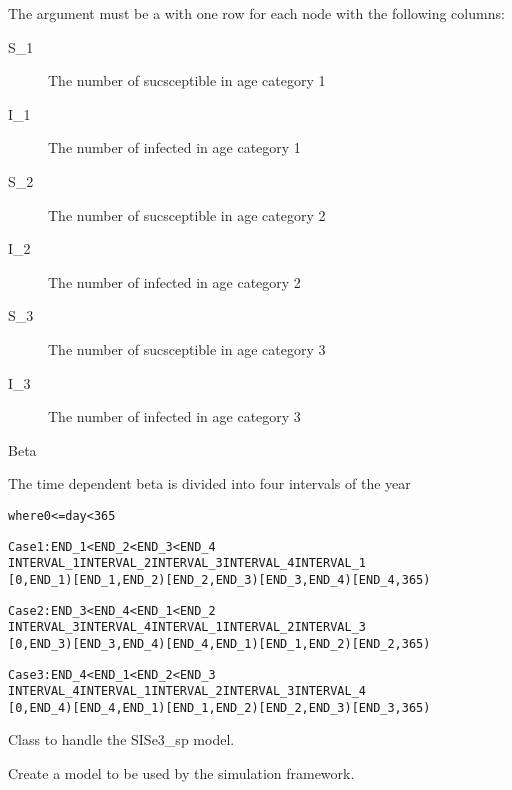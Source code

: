 \documentclass[letterpaper]{book}
\begin{document}
\begin{Details}
The argument  must be a  with one row for
each node with the following columns:
\begin{description}

\item[S\_1] The number of sucsceptible in age category 1
\item[I\_1] The number of infected in age category 1
\item[S\_2] The number of sucsceptible in age category 2
\item[I\_2] The number of infected in age category 2
\item[S\_3] The number of sucsceptible in age category 3
\item[I\_3] The number of infected in age category 3

\end{description}

\end{Details}
%
\begin{Value}
\end{Value}
%
\begin{Section}{Beta}

The time dependent beta is divided into four intervals of the year
\begin{alltt}
where 0 <= day < 365

Case 1: END_1 < END_2 < END_3 < END_4
INTERVAL_1 INTERVAL_2     INTERVAL_3     INTERVAL_4     INTERVAL_1
[0, END_1) [END_1, END_2) [END_2, END_3) [END_3, END_4) [END_4, 365)

Case 2: END_3 < END_4 < END_1 < END_2
INTERVAL_3 INTERVAL_4     INTERVAL_1     INTERVAL_2     INTERVAL_3
[0, END_3) [END_3, END_4) [END_4, END_1) [END_1, END_2) [END_2, 365)

Case 3: END_4 < END_1 < END_2 < END_3
INTERVAL_4 INTERVAL_1     INTERVAL_2     INTERVAL_3     INTERVAL_4
[0, END_4) [END_4, END_1) [END_1, END_2) [END_2, END_3) [END_3, 365)
\end{alltt}

\end{Section}
%
\begin{Description}
Class to handle the SISe3\_sp  model.
\end{Description}
%
\begin{Description}
Create a  model to be used by the simulation
framework.
\end{Description}
\end{document}
